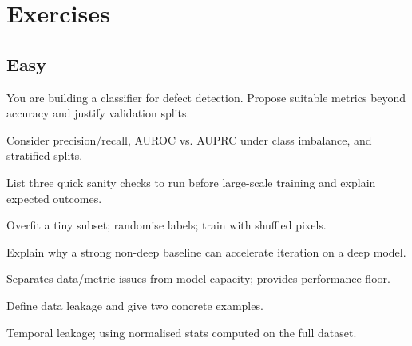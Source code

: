 
\section*{Exercises}

\subsection*{Easy}

\begin{exercisebox}[easy]
\begin{problem}
You are building a classifier for defect detection. Propose suitable metrics beyond accuracy and justify validation splits.
\end{problem}
\begin{hintbox}
Consider precision/recall, AUROC vs. AUPRC under class imbalance, and stratified splits.
\end{hintbox}
\end{exercisebox}


\begin{exercisebox}[easy]
\begin{problem}
List three quick sanity checks to run before large-scale training and explain expected outcomes.
\end{problem}
\begin{hintbox}
Overfit a tiny subset; randomise labels; train with shuffled pixels.
\end{hintbox}
\end{exercisebox}


\begin{exercisebox}[easy]
\begin{problem}
Explain why a strong non-deep baseline can accelerate iteration on a deep model.
\end{problem}
\begin{hintbox}
Separates data/metric issues from model capacity; provides performance floor.
\end{hintbox}
\end{exercisebox}


\begin{exercisebox}[easy]
\begin{problem}
Define data leakage and give two concrete examples.
\end{problem}
\begin{hintbox}
Temporal leakage; using normalised stats computed on the full dataset.
\end{hintbox}
\end{exercisebox}


